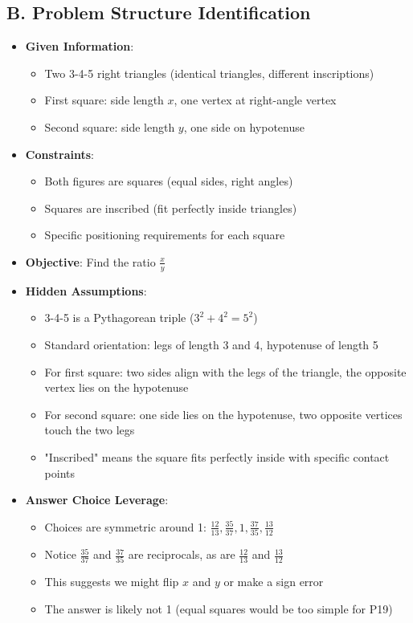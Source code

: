 \documentclass[]{article}
\begin{document}
\begin{problemconfigbox}
\subsection*{B. Problem Structure Identification}
\begin{itemize}[leftmargin=*]
    \item \textbf{Given Information}: 
    \begin{itemize}
        \item Two 3-4-5 right triangles (identical triangles, different inscriptions)
        \item First square: side length $x$, one vertex at right-angle vertex
        \item Second square: side length $y$, one side on hypotenuse
    \end{itemize}
    \item \textbf{Constraints}: 
    \begin{itemize}
        \item Both figures are squares (equal sides, right angles)
        \item Squares are inscribed (fit perfectly inside triangles)
        \item Specific positioning requirements for each square
    \end{itemize}
    \item \textbf{Objective}: Find the ratio $\frac{x}{y}$
    \item \textbf{Hidden Assumptions}: 
    \begin{itemize}
        \item 3-4-5 is a Pythagorean triple ($3^2 + 4^2 = 5^2$)
        \item Standard orientation: legs of length 3 and 4, hypotenuse of length 5
        \item For first square: two sides align with the legs of the triangle, the opposite vertex lies on the hypotenuse
        \item For second square: one side lies on the hypotenuse, two opposite vertices touch the two legs
        \item "Inscribed" means the square fits perfectly inside with specific contact points
    \end{itemize}
    \item \textbf{Answer Choice Leverage}: 
    \begin{itemize}
        \item Choices are symmetric around 1: $\frac{12}{13}, \frac{35}{37}, 1, \frac{37}{35}, \frac{13}{12}$
        \item Notice $\frac{35}{37}$ and $\frac{37}{35}$ are reciprocals, as are $\frac{12}{13}$ and $\frac{13}{12}$
        \item This suggests we might flip $x$ and $y$ or make a sign error
        \item The answer is likely not 1 (equal squares would be too simple for P19)
    \end{itemize}
\end{itemize}


\end{problemconfigbox}
\end{document}
